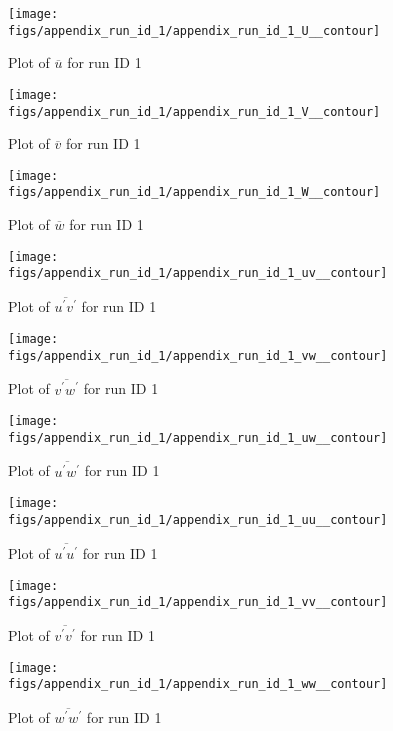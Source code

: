 \begin{figure}[H]
\centering
\texttt{[image: figs/appendix\_run\_id\_1/appendix\_run\_id\_1\_U\_\_contour]}
\caption{Plot of $\overline{u}$ for run ID 1}
\label{fig:appendix_run_id_1_U__contour}
\end{figure}


\begin{figure}[H]
\centering
\texttt{[image: figs/appendix\_run\_id\_1/appendix\_run\_id\_1\_V\_\_contour]}
\caption{Plot of $\overline{v}$ for run ID 1}
\label{fig:appendix_run_id_1_V__contour}
\end{figure}


\begin{figure}[H]
\centering
\texttt{[image: figs/appendix\_run\_id\_1/appendix\_run\_id\_1\_W\_\_contour]}
\caption{Plot of $\overline{w}$ for run ID 1}
\label{fig:appendix_run_id_1_W__contour}
\end{figure}


\begin{figure}[H]
\centering
\texttt{[image: figs/appendix\_run\_id\_1/appendix\_run\_id\_1\_uv\_\_contour]}
\caption{Plot of $\overline{u^\prime v^\prime}$ for run ID 1}
\label{fig:appendix_run_id_1_uv__contour}
\end{figure}


\begin{figure}[H]
\centering
\texttt{[image: figs/appendix\_run\_id\_1/appendix\_run\_id\_1\_vw\_\_contour]}
\caption{Plot of $\overline{v^\prime w^\prime}$ for run ID 1}
\label{fig:appendix_run_id_1_vw__contour}
\end{figure}


\begin{figure}[H]
\centering
\texttt{[image: figs/appendix\_run\_id\_1/appendix\_run\_id\_1\_uw\_\_contour]}
\caption{Plot of $\overline{u^\prime w^\prime}$ for run ID 1}
\label{fig:appendix_run_id_1_uw__contour}
\end{figure}


\begin{figure}[H]
\centering
\texttt{[image: figs/appendix\_run\_id\_1/appendix\_run\_id\_1\_uu\_\_contour]}
\caption{Plot of $\overline{u^\prime u^\prime}$ for run ID 1}
\label{fig:appendix_run_id_1_uu__contour}
\end{figure}


\begin{figure}[H]
\centering
\texttt{[image: figs/appendix\_run\_id\_1/appendix\_run\_id\_1\_vv\_\_contour]}
\caption{Plot of $\overline{v^\prime v^\prime}$ for run ID 1}
\label{fig:appendix_run_id_1_vv__contour}
\end{figure}


\begin{figure}[H]
\centering
\texttt{[image: figs/appendix\_run\_id\_1/appendix\_run\_id\_1\_ww\_\_contour]}
\caption{Plot of $\overline{w^\prime w^\prime}$ for run ID 1}
\label{fig:appendix_run_id_1_ww__contour}
\end{figure}


